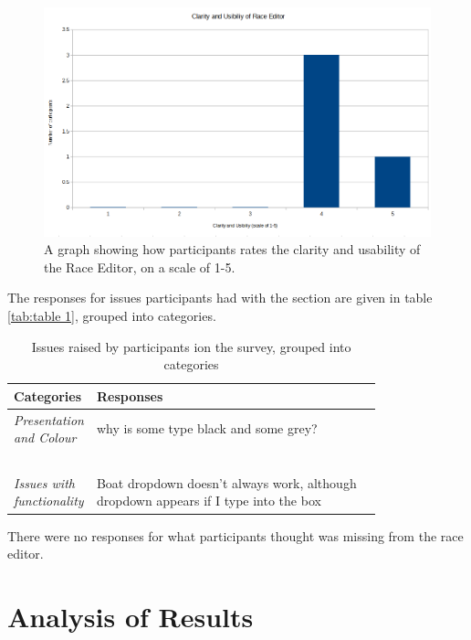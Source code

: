 \documentclass{l4proj}
\begin{document}
\begin{figure}[H]
    \centering
    \includegraphics[width=1\linewidth]{images/Results 3.png} 

    \caption{A graph showing how participants rates the clarity and usability of the Race Editor, on a scale of 1-5.
    }

    \label{fig:results3}
\end{figure}

The responses for issues participants had with the section are given in table \ref{tab:table 1}, grouped into categories.

\begin{table}[!ht]
    \centering
    \caption{Issues raised by participants ion the survey, grouped into categories}
    \begin{tabular}{|l|p{0.8\linewidth}|}
    \hline
        \textbf{Categories} & \textbf{Responses}  \\ \hline
        \textit{Presentation and Colour} & why is some type black and some grey?  \\ \hline
        ~ & ~ \\ \hline
        \textit{Issues with functionality} & Boat dropdown doesn't always work, although dropdown appears if I type into the box  \\ \hline
    \end{tabular}
    \label{tab:table 3}
\end{table}

There were no responses for what participants thought was missing from the race editor.


\section{Analysis of Results}
\end{document}
